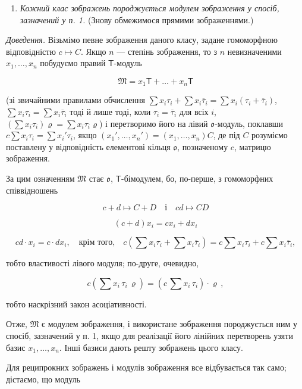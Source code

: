 \documentclass[11pt]{article}
\providecommand{\tightlist}{\setlength{\itemsep}{0pt}\setlength{\parskip}{0pt}}
\begin{document}
\begin{enumerate}
\def\labelenumi{\arabic{enumi}.}
\setcounter{enumi}{1}
\tightlist
\item
  \emph{Кожний клас зображень породжується модулем зображення у спосіб, зазначений у п. 1.} (Знову обмежимося прямими зображеннями.)
\end{enumerate}

\emph{Доведення.} Візьмімо певне зображення даного класу, задане гомоморфною відповідністю \(c\mapsto C\). Якщо \(n\) --- степінь зображення, то з \(n\) невизначеними \(x_1,\ldots,x_n\) побудуємо правий \(\mathsf T\)-модуль

\[\mathfrak{M} = x_1 \mathsf{T} + \dots + x_n \mathsf{T}\]

(зі звичайними правилами обчислення \(\sum x_i\tau_i+\sum x_i\overline{\tau}_i=\sum x_i(\tau_i+\overline{\tau}_i)\), \(\sum x_i\tau_i=\sum x_i\overline{\tau}_i\) тоді й лише тоді, коли \(\tau_i=\overline{\tau}_i\) для всіх \(i\), \((\sum x_i\tau_i)\varrho=\sum x_i\tau_i\varrho\)) і перетворимо його на лівий \(\mathfrak{o}\)-модуль, поклавши \(c\sum x_i\tau_i=\sum x_i'\tau_i\), якщо \((x_1',\ldots,x_n')=(x_1,\ldots,x_n)C\), де під \(C\) розуміємо поставлену у відповідність елементові кільця \(\mathfrak{o}\), позначеному \(c\), матрицю зображення.

За цим означенням \(\mathfrak M\) стає \(\mathfrak{o}\), \(\mathsf T\)-бімодулем, бо, по-перше, з гомоморфних співвідношень

\[
c+d\mapsto C+D \quad \text{і} \quad cd\mapsto CD
\]

\[
(c+d)x_i=cx_i+dx_i
\]

\[
cd\cdot x_i=c\cdot dx_i,\quad\text{крім того,}\quad
c\left(\sum x_i\tau_i+\sum x_i\overline{\tau}_i\right)
=c\sum x_i\tau_i+c\sum x_i\overline{\tau}_i,
\]

тобто властивості лівого модуля; по-друге, очевидно,

\[c(\sum x_i \, \tau_i \, \varrho) = (c \, \sum x_i \, \tau_i) \cdot \varrho \,,\]

тобто наскрізний закон асоціативності.

Отже, \(\mathfrak{M}\) є модулем зображення, і використане зображення породжується ним у спосіб, зазначений у п. 1, якщо для реалізації його лінійних перетворень узяти базис \(x_1, \ldots, x_n\). Інші базиси дають решту зображень цього класу.

Для реципрокних зображень і модулів зображення все відбувається так само; дістаємо, що модуль
\end{document}
